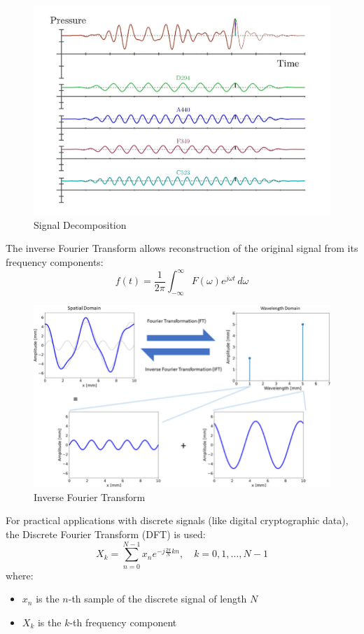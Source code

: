 \documentclass{article}
\begin{document}
\begin{figure}[!ht]
    \centering
    \includegraphics[width=\textwidth]{./pics/decomp.png}
    \caption{Signal Decomposition}
    \label{fig:signal_decomp}
\end{figure}


The inverse Fourier Transform allows reconstruction of the original signal from its frequency components:
\[
    f(t) = \frac{1}{2\pi} \int_{-\infty}^{\infty} F(\omega) e^{j\omega t} \, d\omega
\]

\begin{figure}[!ht]
    \centering
    \includegraphics[width=\textwidth]{./pics/inverse-fourier-transform.png}
    \caption{Inverse Fourier Transform}
    \label{fig:inv_fourier_transform}
\end{figure}

For practical applications with discrete signals (like digital cryptographic data), the Discrete Fourier Transform (DFT) is used:
\[
    X_k = \sum_{n=0}^{N-1} x_n e^{-j \frac{2\pi}{N} kn}, \quad k = 0,1,\ldots,N-1
\]
where:
\begin{itemize}
    \item $x_n$ is the $n$-th sample of the discrete signal of length $N$
    \item $X_k$ is the $k$-th frequency component
\end{itemize}
\end{document}
